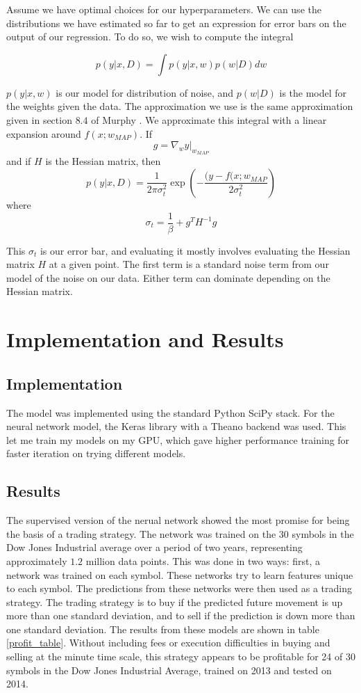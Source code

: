 \documentclass{article}
\begin{document}
Assume we have optimal choices for our hyperparameters. We can
use the distributions we have estimated so far to get an expression
for error bars on the output of our regression. To do so, we wish
to compute the integral 

\[ p(y|x, D) = \int p(y|x,w) p(w|D)  dw \]

$p(y|x, w)$ is our model for distribution of noise, and $p(w|D)$ is
the model for the weights given the data. The approximation we use
is the same approximation given in section $8.4$ of Murphy \cite{murphy2012machine}.
We approximate this integral with a linear expansion around $f(x; w_{MAP})$.
If 
\[ g = \nabla_w y|_{w_{MAP}} \]
and if $H$ is the Hessian matrix, then 
\[ p(y|x, D) = \frac{1}{2\pi \sigma_t^2} \exp\left(-\frac{(y-f(x;w_{MAP}}{2\sigma_t^2} \right) \]
where
\[ \sigma_t = \frac{1}{\beta} + g^T H^{-1} g \]

This $\sigma_t$ is our error bar, and evaluating it mostly involves evaluating the
Hessian matrix $H$ at a given point. The first term is a standard noise term
from our model of the noise on our data. Either term can dominate depending
on the Hessian matrix.

\section{Implementation and Results}

\subsection{Implementation}
The model was implemented using the standard Python SciPy stack. For
the neural network model, the Keras library with a Theano backend was
used. This let me train my models on my GPU, which gave higher
performance training for faster iteration on trying different models.

\subsection{Results}
The supervised version of the nerual network showed the most promise for
being the basis of a trading strategy. The network was trained on
the $30$ symbols in the Dow Jones Industrial average over a period of
two years, representing approximately $1.2$ million data points. This
was done in two ways: first, a network was trained on each symbol. These
networks try to learn features unique to each symbol. 
The predictions from these networks were then used as a trading strategy. The trading
strategy is to buy if the predicted future movement is up more than one standard
deviation, and to sell if the prediction is down more than one standard deviation.
The results from these models are shown in table \ref{profit_table}. Without
including fees or execution difficulties in buying and selling at the minute
time scale, this strategy appears to be profitable for 24 of 30 symbols in the
Dow Jones Industrial Average, trained on 2013 and tested on 2014.
\end{document}
